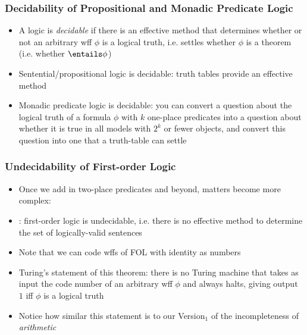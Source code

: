 \begin{frame}
\frametitle{Decidability of Propositional and Monadic Predicate Logic}


\begin{itemize}[<+->]

\item A logic is \emph{decidable} if there is an effective method that determines whether or not an arbitrary wff $\phi$ is a logical truth, i.e. settles whether $\phi$ is a theorem (i.e. whether $\entails \phi$)

\item Sentential/propositional logic is decidable: truth tables provide an effective method

\item Monadic predicate logic is decidable: you can convert a question about the logical truth of a formula $\phi$ with $k$ one-place predicates into a question about whether it is true in all models with $2^k$ or fewer objects, and convert this question into one that a truth-table can settle


\end{itemize}
\end{frame}


\begin{frame}
\frametitle{Undecidability of First-order Logic}

\begin{itemize}[<+->]

\item Once we add in two-place predicates and beyond, matters become more complex: 

\item  {}: first-order logic is undecidable, i.e. there is no effective method to determine the set of logically-valid sentences

\item Note that we can code wffs of FOL with identity as numbers

\item Turing's statement of this theorem: there is no Turing machine that takes as input the code number of an arbitrary wff $\phi$ and always halts, giving output $1$ iff $\phi$ is a logical truth

\item Notice how similar this statement is to our Version$_1$ of the incompleteness of \textit{arithmetic} 

\end{itemize}
\end{frame}

